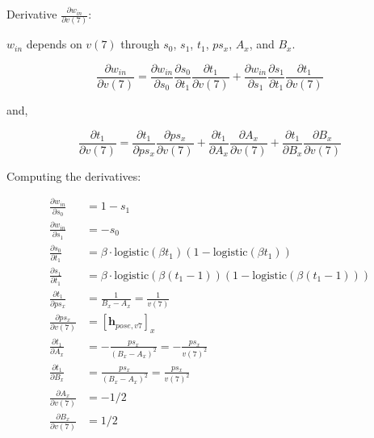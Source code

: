 \documentclass[11pt]{article}
\begin{document}
            Derivative $\frac{\partial w_{in}}{\partial v(7)}$:

            $w_{in}$ depends on $v(7)$ through $s_0$, $s_1$, $t_1$, $ps_x$, $A_x$, and $B_x$.

            \begin{equation}
                \frac{\partial w_{in}}{\partial v(7)} = \frac{\partial w_{in}}{\partial s_0}\frac{\partial s_0}{\partial t_1}\frac{\partial t_1}{\partial v(7)}  + \frac{\partial w_{in}}{\partial s_1}\frac{\partial s_1}{\partial t_1}\frac{\partial t_1}{\partial v(7)}
            \end{equation}

            and,

            \begin{equation}
                \frac{\partial t_1}{\partial v(7)} = \frac{\partial t_1}{\partial ps_x}\frac{\partial ps_x}{\partial v(7)} + \frac{\partial t_1}{\partial A_x}\frac{\partial A_x}{\partial v(7)} + \frac{\partial t_1}{\partial B_x}\frac{\partial B_x}{\partial v(7)}
            \end{equation}

            Computing the derivatives:

            \begin{align}
                \frac{\partial w_{in}}{\partial s_0} &= 1 - s_1 \\
                \frac{\partial w_{in}}{\partial s_1} &= -s_0 \\
                \frac{\partial s_0}{\partial t_1} &= \beta \cdot \text{logistic}(\beta t_1)(1 - \text{logistic}(\beta t_1)) \\
                \frac{\partial s_1}{\partial t_1} &= \beta \cdot \text{logistic}(\beta (t_1 - 1))(1 - \text{logistic}(\beta (t_1 - 1))) \\
                \frac{\partial t_1}{\partial ps_x} &= \frac{1}{B_x - A_x} = \frac{1}{v(7)} \\
                \frac{\partial ps_x}{\partial v(7)}  &= [\mathbf{h}_{pose,v7}]_x \\
                \frac{\partial t_1}{\partial A_x} &= - \frac{ps_x}{(B_x - A_x)^2}  = -\frac{ps_x}{v(7)^2}\\
                \frac{\partial t_1}{\partial B_x} &=  \frac{ps_{x}}{(B_x - A_x)^2} = \frac{ps_x}{v(7)^2}\\
                \frac{\partial A_x}{\partial v(7)} &= -1/2 \\
                \frac{\partial B_x}{\partial v(7)} &= 1/2
            \end{align}
\end{document}
